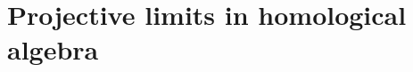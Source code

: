 \section{Projective limits in homological algebra}
\label{section:projective-limits-in-homological-algebra}
